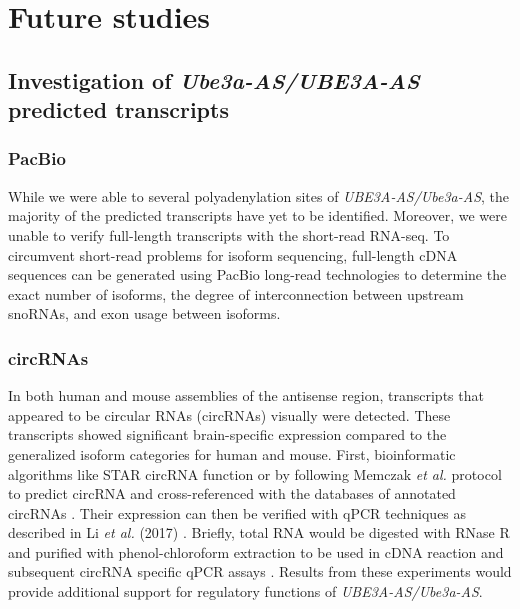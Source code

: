 \section{Future studies}
\subsection{Investigation of \textit{Ube3a-AS/UBE3A-AS} predicted transcripts}
\subsubsection{PacBio}
While we were able to several polyadenylation sites of \textit{UBE3A-AS/Ube3a-AS}, the majority of the predicted transcripts have yet to be identified. Moreover, we were unable to verify full-length transcripts with the short-read RNA-seq. To circumvent short-read problems for isoform sequencing, full-length cDNA sequences can be generated using PacBio long-read technologies to determine the exact number of isoforms, the degree of interconnection between upstream snoRNAs, and exon usage between isoforms. 

\subsubsection{circRNAs}
In both human and mouse assemblies of the antisense region, transcripts that appeared to be circular RNAs (circRNAs) visually were detected. These transcripts showed significant brain-specific expression compared to the generalized isoform categories for human and mouse. First, bioinformatic algorithms like STAR circRNA function \cite{Dobin2012} or by following Memczak \textit{et al.} protocol \cite{Memczak2013} to predict circRNA and cross-referenced with the databases of annotated circRNAs \cite{Guo2014}. Their expression can then be verified with qPCR techniques as described in Li \textit{et al.} (2017) \cite{Li2017}. Briefly, total RNA would be digested with RNase R and purified with phenol-chloroform extraction to be used in cDNA reaction and subsequent circRNA specific qPCR assays \cite{Memczak2013}. Results from these experiments would provide additional support for regulatory functions of \textit{UBE3A-AS/Ube3a-AS}. 

